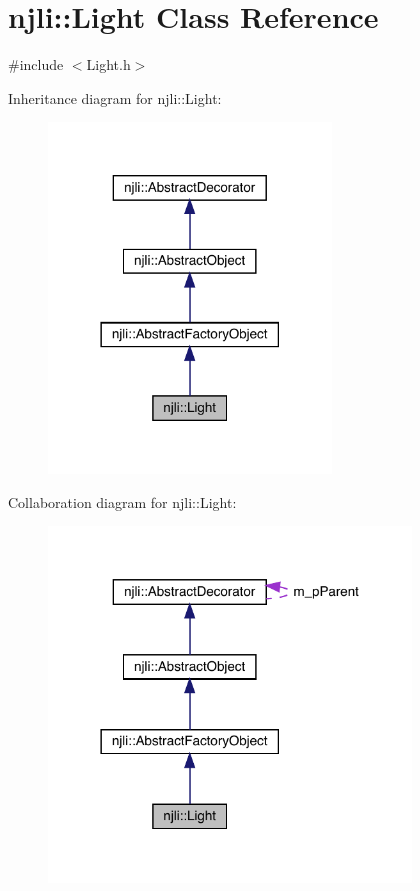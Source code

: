 \hypertarget{classnjli_1_1_light}{}\section{njli\+:\+:Light Class Reference}
\label{classnjli_1_1_light}


{\ttfamily \#include $<$Light.\+h$>$}



Inheritance diagram for njli\+:\+:Light\+:\nopagebreak
\begin{figure}[H]
\begin{center}
\leavevmode
\includegraphics[width=213pt]{classnjli_1_1_light__inherit__graph}
\end{center}
\end{figure}


Collaboration diagram for njli\+:\+:Light\+:\nopagebreak
\begin{figure}[H]
\begin{center}
\leavevmode
\includegraphics[width=273pt]{classnjli_1_1_light__coll__graph}
\end{center}
\end{figure}
